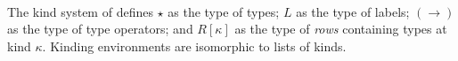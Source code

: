 \documentclass[authoryear, acmsmall, screen, review, nonacm]{acmart} %
\begin{document}
\begin{minipage}[t]{0.45\textwidth}
\begin{code}%
\>[0]\AgdaSpace{}%
\AgdaSpace{}%
\AgdaSymbol{:}\AgdaSpace{}%
\AgdaSpace{}%
\<%
\\
\>[0][@{}l@{\AgdaIndent{0}}]%
\>[2]%
\>[8]\AgdaSymbol{:}\AgdaSpace{}%
\<%
\\
%
\>[2]%
\>[8]\AgdaSymbol{:}\AgdaSpace{}%
\<%
\\
%
\>[2]\AgdaSpace{}%
\AgdaSymbol{:}\AgdaSpace{}%
\AgdaSpace{}%
\AgdaSpace{}%
\AgdaSpace{}%
\AgdaSpace{}%
\<%
\\
%
\>[2]%
\>[8]\AgdaSymbol{:}\AgdaSpace{}%
\AgdaSpace{}%
\AgdaSpace{}%
\<%
\end{code}
\end{minipage}%
\hfill
\begin{minipage}[t]{0.45\textwidth}
\begin{code}%
\>[0]\AgdaSpace{}%
\AgdaSpace{}%
\AgdaSymbol{:}\AgdaSpace{}%
\AgdaSpace{}%
\<%
\\
\>[0][@{}l@{\AgdaIndent{0}}]%
\>[2]\AgdaSpace{}%
\AgdaSymbol{:}\AgdaSpace{}%
\<%
\\
%
\>[2]\AgdaOperator{\AgdaInductiveConstructor{\AgdaUnderscore{},,\AgdaUnderscore{}}}\AgdaSpace{}%
\AgdaSymbol{:}\AgdaSpace{}%
\AgdaSpace{}%
\AgdaSpace{}%
\AgdaSpace{}%
\AgdaSpace{}%
\<%
\end{code}
\end{minipage}
\begin{code}[hide]%
\>[0]\AgdaSpace{}%
\AgdaSpace{}%
\<%
\end{code}

The kind system of \Rome defines $\star$ as the type of types; $L$ as the type of labels; $(\to)$ as the type of type operators; and $R[\kappa]$ as the type of \emph{rows} containing types at kind $\kappa$. Kinding environments are isomorphic to lists of kinds.
\end{document}
